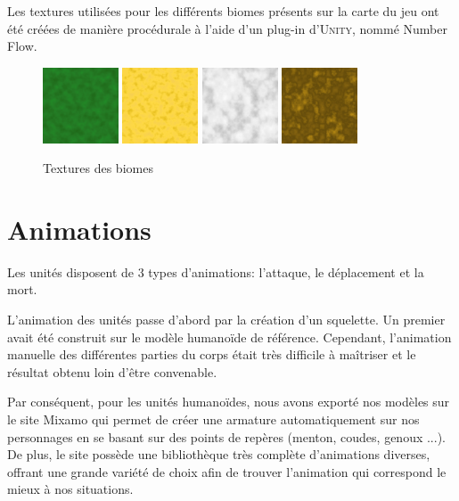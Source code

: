 \documentclass[12pt]{report}
\begin{document}
Les textures utilisées pour les différents biomes présents sur la carte du jeu
ont été créées de manière procédurale à l’aide d’un plug-in d'\textsc{Unity},
nommé Number Flow.

\begin{figure}[H]
    \centering
    \includegraphics[width=0.2\textwidth]{../report_1/img/plain}
    \includegraphics[width=0.2\textwidth]{../report_1/img/sand}
    \includegraphics[width=0.2\textwidth]{snow}
    \includegraphics[width=0.2\textwidth]{mountain}
    \caption*{Textures des biomes}
\end{figure}

\section{Animations}

Les unités disposent de 3 types d’animations: l’attaque, le déplacement et la
mort.

L’animation des unités passe d’abord par la création d’un squelette. Un premier
avait été construit sur le modèle humanoïde de référence. Cependant, l’animation
manuelle des différentes parties du corps était très difficile à maîtriser et le
résultat obtenu loin d’être convenable.

Par conséquent, pour les unités humanoïdes, nous avons exporté nos modèles sur
le site Mixamo qui permet de créer une armature automatiquement sur nos
personnages en se basant sur des points de repères (menton, coudes, genoux ...).
De plus, le site possède une bibliothèque très complète d’animations diverses,
offrant une grande variété de choix afin de trouver l’animation qui correspond
le mieux à nos situations.
\end{document}
